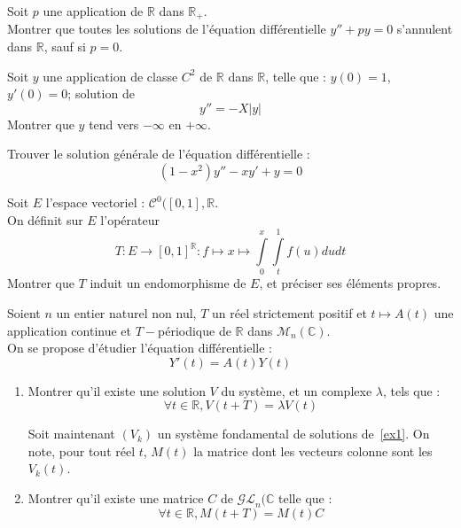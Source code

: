 \begin{exer}
Soit $p$ une application de $\mathbb{R}$ dans $\mathbb{R}_+$.\\
Montrer que toutes les solutions de l'équation différentielle $y'' + py = 0$ s'annulent dans $\mathbb{R}$, sauf si $p = 0$.
\end{exer}

\begin{exer}
Soit $y$ une application de classe $C^2$ de $\mathbb{R}$ dans $\mathbb{R}$, telle que : $y(0) = 1$, $y'(0) = 0$; solution de
\[y'' = -X|y|\]
Montrer que $y$ tend vers $- \infty$ en $+ \infty$.
\end{exer}

\begin{exer}
Trouver le solution g\'en\'erale de l'\'equation diff\'erentielle :
\[(1-x^2)y''-xy'+y=0\]
\end{exer}

\begin{exer}
Soit $E$ l'espace vectoriel : $\mathcal{C}^0([0,1],\mathbb{R}$.\\
On d\'efinit sur $E$ l'op\'erateur \[T:E\rightarrow [0,1]^{\mathbb{R}}:f\mapsto x\mapsto \int\limits_0^x \int\limits_t^1 f(u)dudt\]
Montrer que $T$ induit un endomorphisme de $E$, et pr\'eciser ses \'el\'ements propres.
\end{exer}

\begin{exer}
Soient $n$ un entier naturel non nul, $T$ un r\'eel strictement positif %
et $t\mapsto A(t)$ une application continue et $T-$p\'eriodique de $\mathbb{R}$ dans $\mathcal{M}_n(\mathbb{C})$.\\
On se propose d'\'etudier l'\'equation  diff\'erentielle :
\begin{equation}
Y'(t)=A(t)Y(t)
\label{ex1}
\end{equation}
\begin{enumerate}
\item Montrer qu'il existe une solution $V$ du syst\`eme, et un complexe $\lambda$, tels que :
\[\forall t \in \mathbb{R} , V(t+T)=\lambda V(t)\]

\smallskip
Soit maintenant $(V_k)$ un syst\`eme fondamental de solutions de~\eqref{ex1}. %
On note, pour tout r\'eel $t$, $M(t)$ la matrice dont les vecteurs colonne sont les $V_k(t)$.
\item Montrer qu'il existe une matrice $C$ de $\mathcal{GL}_n(\mathbb{C}$ telle que :\[\forall t \in \mathbb{R} , M(t+T)=M(t)C\]
\end{enumerate}
\end{exer}

